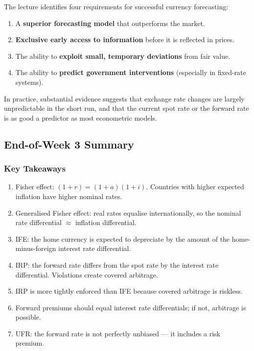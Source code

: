 \documentclass[11pt,a4paper]{article}
\begin{document}
The lecture identifies four requirements for successful currency forecasting:
\begin{enumerate}
  \item A \textbf{superior forecasting model} that outperforms the market.
  \item \textbf{Exclusive early access to information} before it is reflected in prices.
  \item The ability to \textbf{exploit small, temporary deviations} from fair value.
  \item The ability to \textbf{predict government interventions} (especially in fixed-rate systems).
\end{enumerate}

In practice, substantial evidence suggests that exchange rate changes are largely unpredictable in the short run, and that the current spot rate or the forward rate is as good a predictor as most econometric models.

\subsection{End-of-Week 3 Summary}

\subsubsection*{Key Takeaways}
\begin{enumerate}
  \item Fisher effect: $(1+r) = (1+a)(1+i)$. Countries with higher expected inflation have higher nominal rates.
  \item Generalised Fisher effect: real rates equalise internationally, so the nominal rate differential $\approx$ inflation differential.
  \item IFE: the home currency is expected to depreciate by the amount of the home-minus-foreign interest rate differential.
  \item IRP: the forward rate differs from the spot rate by the interest rate differential. Violations create covered arbitrage.
  \item IRP is more tightly enforced than IFE because covered arbitrage is riskless.
  \item Forward premiums should equal interest rate differentials; if not, arbitrage is possible.
  \item UFR: the forward rate is not perfectly unbiased --- it includes a risk premium.
\end{enumerate}
\end{document}
